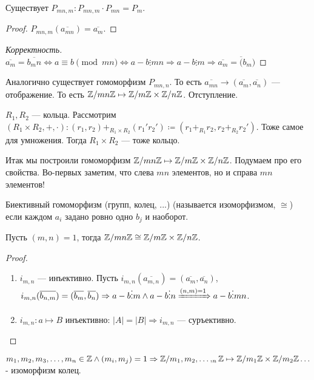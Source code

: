 Существует $P_{mn,m}: P_{mn, m} \cdot P_{mn} = P_{m}$. 
 \begin{proof}
     $P_{mn, m}(\overline{a_{mn}}) = \overline{a_m}$.
\end{proof}
\begin{proof}[Корректность]
    $\overline{a_m} = \overline{b_mn} \iff a \equiv b \pmod{mn} \iff a-b \vdots mn \Rightarrow a-b \vdots m \Rightarrow \overline{a_m} = \overline(b_m)$
\end{proof}
\slashn Аналогично существует гомоморфизм $P_{mn, n}$. То есть $\overline{a_{mn}} \rightarrow (\overline{a_m}, \overline{a_n})$ --- отображение. То есть $\mathbb{Z} / mn \mathbb{Z} \mapsto \mathbb{Z} / m\mathbb{Z} \times \mathbb{Z} / n \mathbb{Z}$.
Отступление.
\begin{definition}
    $R_1, R_2$ --- кольца. Рассмотрим  $(R_1 \times R_2, +, \cdot): (r_1, r_2) +_{R_1\times R_2} (r_1'r_2') \coloneqq (r_1+_{R_1}r_2, r_2+_{R_2}r_2')$. Тоже самое для умножения. Тогда $R_1 \times R_2$ --- тоже кольцо.
\end{definition}
\slashn
Итак мы построили гомоморфизм $\mathbb{Z} / mn \mathbb{Z} \mapsto \mathbb{Z} / m\mathbb{Z} \times \mathbb{Z} / n \mathbb{Z}$. Подумаем про его свойства. Во-первых заметим, что слева $mn$ элементов, но и справа $mn$ элементов!

\begin{definition}
    Биективный гомоморфизм (групп, колец, ...) (называется изоморфизмом, $\cong$) если каждом $a_i$ задано ровно одно  $b_j$ и наоборот.
\end{definition}
\begin{theorem}
    Пусть $(m, n)=1$, тогда $\mathbb{Z} / mn \mathbb{Z} \cong \mathbb{Z} / m\mathbb{Z} \times \mathbb{Z} / n \mathbb{Z}$.
\end{theorem}
\begin{proof}
    \slashn
    \begin{enumerate}
        \item $i_{m,n}$ --- инъективно. Пусть $i_{m,n}(\overline{a_{m,n}}) = (\overline{a_m}, \overline{a_n})$,  $i_{m,n}(\overline{b_{n, m}}) = (\overline{b_m}, \overline{b_n}) \Rightarrow  a-b \vdots m \land a-b\vdots n \xRightarrow{(n, m) = 1} a - b \vdots mn$.
        \item $i_{m, n}: a \mapsto B$ инъективно: $|A| = |B| \Rightarrow i_{m, n}$ --- суръективно.  
    \end{enumerate}
\end{proof}
\begin{theorem}[КТО 2]
    $m_1,m_2,m_3,\ldots,m_n \in \mathbb{Z} \land (m_i, m_j) = 1 \Rightarrow \mathbb{Z} / m_1,m_2,\ldots,_n \mathbb{Z} \mapsto \mathbb{Z} / m_1\mathbb{Z} \times \mathbb{Z} / m_2\mathbb{Z} \ldots$ - изоморфизм колец. 
\end{theorem}
